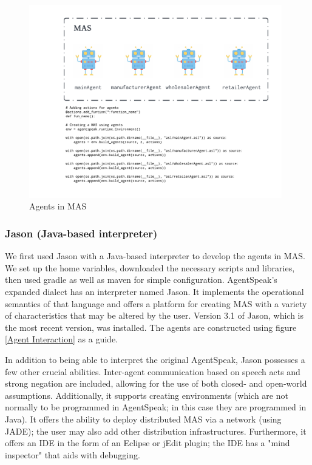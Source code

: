 \begin{figure}[h]
\centering
  \includegraphics[width=11cm]{includes/figures/MAS.png} 
  \caption{Agents in \ac{MAS}}
  \label{Agents in MAS}
\end{figure}

\subsubsection{Jason (Java-based interpreter)}

We first used Jason with a Java-based interpreter to develop the agents in \ac{MAS}. We set up the home variables, downloaded the necessary scripts and libraries, then used gradle as well as maven for simple configuration. AgentSpeak's expanded dialect has an interpreter named Jason. It implements the operational semantics of that language and offers a platform for creating \ac{MAS} with a variety of characteristics that may be altered by the user. Version 3.1 of Jason, which is the most recent version, was installed. The agents are constructed using figure  \ref{Agent Interaction} as a guide.

\vspace{.5cm}

In addition to being able to interpret the original AgentSpeak, Jason possesses a few other crucial abilities. Inter-agent communication based on speech acts and strong negation are included, allowing for the use of both closed- and open-world assumptions. Additionally, it supports creating environments (which are not normally to be programmed in AgentSpeak; in this case they are programmed in Java). It offers the ability to deploy distributed \ac{MAS} via a network (using \ac{JADE}); the user may also add other distribution infrastructures. Furthermore, it offers an \ac{IDE} in the form of an Eclipse or jEdit plugin; the \ac{IDE} has a "mind inspector" that aids with debugging.

